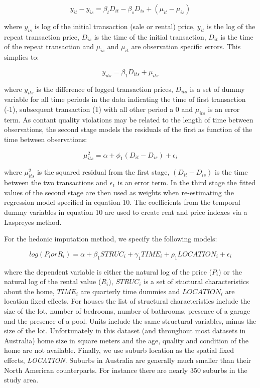 \documentclass{article}\usepackage[]{graphicx}\usepackage[]{color}
\begin{document}
\begin{equation}
  y_{it} - y_{is} = \beta_t D_{it} -\beta_s D_{is} + (\mu_{it} - \mu_{is})
\end{equation}

where $y_{is}$ is log of the initial transaction (sale or rental) price, $y_{it}$ is the log of the repeat transaction price, $D_{is}$ is the time of the initial transaction, $D_{it}$ is the time of the repeat transaction and $\mu_{is}$ and $\mu_{it}$ are observation specific errors. This simplies to:

\begin{equation}
  y_{its} = \beta_1 D_{its} + \mu_{its}
\end{equation}

where $y_{its}$ is the difference of logged transaction prices, $D_{its}$ is a set of dummy variable for all time periods in the data indicating the time of first transaction (-1), subsequent transaction (1) with all other period a 0 and $\mu_{its}$ is an error term. As contant quality violations may be related to the length of time between observations, the second stage models the residuals of the first as function of the time between observations:

\begin{equation}
  \mu_{its}^2 = \alpha + \phi_1 (D_{it} - D_{is}) + \epsilon_i
\end{equation}

where $\mu_{its}^2$ is the squared residual from the first stage, $(D_{it} - D_{is})$ is the time between the two transactions and $\epsilon_1$ is an error term. In the third stage the fitted values of the second stage are then used as weights when re-estimating the regression model specified in equation 10. The coefficients from the temporal dummy variables in equation 10 are used to create rent and price indexes via a Laspreyes method.

For the hedonic imputation method, we specify the following models:

 \begin{equation}
  log(P_i or R_i) = \alpha + \beta_1 STRUC_i + \gamma_1 TIME_i + \rho_1 LOCATION_i + \epsilon_i
 \end{equation}

where the dependent variable is either the natural log of the price (\textit{$P_i$}) or the natural log of the rental value (\textit{$R_i$}), \textit{$STRUC_i$} is a set of stuctural characteristics about the home, \textit{$TIME_i$} are quarterly time dummies and \textit{$LOCATION_i$} are location fixed effects.  For houses the list of structural characteristics include the size of the lot, number of bedrooms, number of bathrooms, presence of a garage and the presence of a pool.  Units include the same structural variables, minus the size of the lot.  Unfortunately in this dataset (and throughout most datasets in Australia) home size in square meters and the age, quality and condition of the home are not available. Finally, we use suburb location as the spatial fixed effects, \textit{LOCATION}.  Suburbs in Australia are generally much smaller than their North American counterparts.  For instance there are nearly 350 suburbs in the study area.\par
\end{document}
